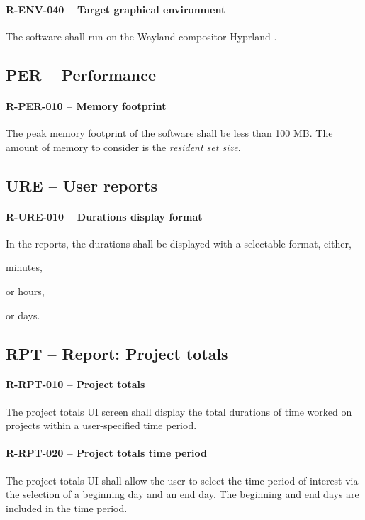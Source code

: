 \paragraph{R-ENV-040 -- Target graphical environment}
The software shall run on the Wayland compositor Hyprland \cite{hyprland}.

\subsection{PER -- Performance}
\paragraph{R-PER-010 -- Memory footprint}
The peak memory footprint of the software shall be less than 100 MB.
The amount of memory to consider is the \emph{resident set size}.

\subsection{URE -- User reports}
\paragraph{R-URE-010 -- Durations display format}
In the reports, the durations shall be displayed with a selectable format,
either,
\begin{compactitem}
  \item minutes,
  \item or hours,
  \item or days.
\end{compactitem}

\subsection{RPT -- Report: Project totals}
\paragraph{R-RPT-010 -- Project totals}
The project totals \gls{UI} screen shall display the total durations of time
worked on projects within a user-specified time period.

\paragraph{R-RPT-020 -- Project totals time period}
The project totals \gls{UI} shall allow the user to select the time period
of interest via the selection of a beginning day and an end day. The
beginning and end days are included in the time period.

